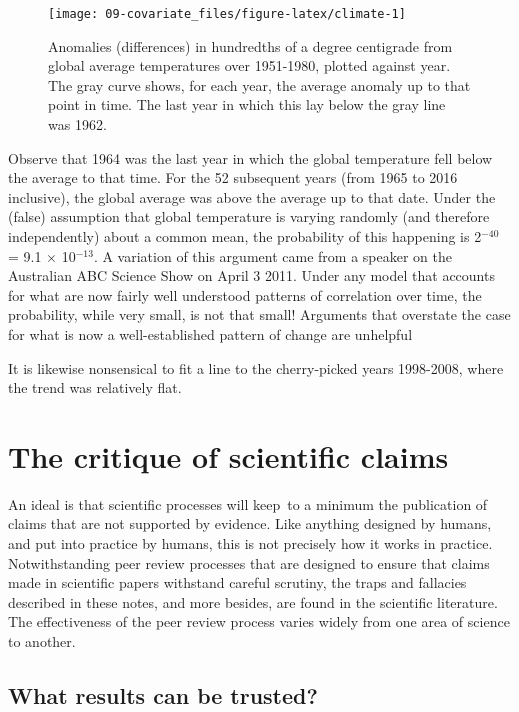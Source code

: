 \documentclass[
  10pt,
  b5paper]{book}
\begin{document}
\begin{figure}[H]
\texttt{[image: 09-covariate\_files/figure-latex/climate-1]} \caption{Anomalies (differences) in hundredths of a degree centigrade
from global average temperatures over 1951-1980, plotted against year.
The gray curve shows, for each year, the average anomaly up to that
point in time.  The last year in which this lay below the gray line
was 1962.}\label{fig:climate}
\end{figure}

Observe that 1964 was the last year in which the global
temperature fell below the average to that time.
For the 52 subsequent years (from 1965 to 2016 inclusive),
the global average was above the average up to that date. Under
the (false) assumption that global temperature is varying
randomly (and therefore independently) about a common mean,
the probability of this happening is 2\(^{-40}\) = 9.1
\(\times\) 10\(^{-13}\). A variation of this argument came
from a speaker on the Australian ABC Science Show on April
3 2011. Under any model that accounts for what are now
fairly well understood patterns of correlation over time,
the probability, while very small, is not that small!
Arguments that overstate the case for what is now a
well-established pattern of change are unhelpful

It is likewise nonsensical to fit a line to the cherry-picked
years 1998-2008, where the trend was relatively flat.

\hypertarget{the-critique-of-scientific-claims}{%
\chapter{The critique of scientific claims}\label{the-critique-of-scientific-claims}}

An ideal is that scientific processes will keep~to a minimum
the publication of claims that are not supported by evidence.
Like anything designed by humans, and put into practice by
humans, this is not precisely how it works in practice.
Notwithstanding peer review processes that are designed to
ensure that claims made in scientific papers withstand
careful scrutiny, the traps and fallacies described in these
notes, and more besides, are found in the scientific literature.
The effectiveness of the peer review process varies widely from
one area of science to another.

\hypertarget{what-results-can-be-trusted}{%
\section{What results can be trusted?}\label{what-results-can-be-trusted}}
\end{document}
